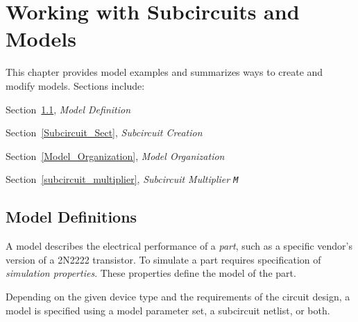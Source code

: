 


\chapter{Working with Subcircuits and Models}
\label{Models}

{
This chapter provides model examples and summarizes ways to create and
modify models.  Sections include:
\begin{XyceItemize}
\item Section~\ref{Model_Def}, {\em Model Definition}
\item Section~\ref{Subcircuit_Sect}, {\em Subcircuit Creation}
\item Section~\ref{Model_Organization}, {\em Model Organization}
\item Section~\ref{subcircuit_multiplier}, {\em Subcircuit Multiplier \texttt{M}}
\end{XyceItemize}
}

\section{Model Definitions}
\label{Model_Def}

A model describes the electrical performance of a {\em part}, such as
a specific vendor's version of a 2N2222 transistor.  To simulate a
part requires specification of {\em simulation properties}.  
These properties define the model of the part.

Depending on the given device type and the requirements of the circuit
design, a model is specified using a model parameter set, a subcircuit
netlist, or both.

